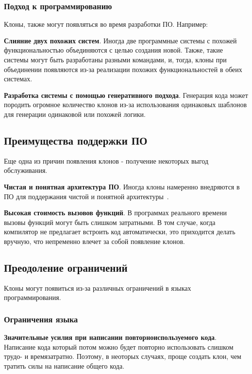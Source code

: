 \subsubsection{Подход к программированию}

Клоны, также могут появляться во время разработки ПО. Например:

\textbf{Слияние двух похожих систем}. Иногда две программные системы с похожей функциональностью объединяются с целью создания новой. Также, такие системы могут быть разработаны разными командами, и, тогда, клоны при объединении появляются из-за реализации похожих функциональностей в обеих системах.

\textbf{Разработка системы с помощью генеративного подхода}. Генерация кода может породить огромное количество клонов из-за использования одинаковых шаблонов для генерации одинаковой или похожей логики.

\subsection{Преимущества поддержки ПО}

Еще одна из причин появления клонов - получение некоторых выгод обслуживания.

\textbf{Чистая и понятная архитектура ПО}. Иногда клоны намеренно внедряются в ПО для поддержания чистой и понятной архитектуры~\cite{forking}.

\textbf{Высокая стоимость вызовов функций}. В программах реального времени вызовы функций могут быть слишком затратными. В том случае, когда компилятор не предлагает встроить код автоматически, это приходится делать вручную, что непременно влечет за собой появление клонов.

\subsection{Преодоление ограничений}

Клоны могут появиться из-за различных ограничений в языках программирования.

\subsubsection{Ограничения языка}

\textbf{Значительные усилия при написании повторноиспользуемого кода}. Написание кода который потом можно будет повторно использовать слишком трудо- и времязатратно. Поэтому, в неоторых случаях, проще создать клон, чем тратить силы на написание общего кода.

